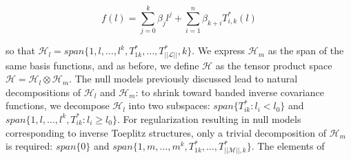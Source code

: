 \documentclass[12pt]{article}
\theoremstyle{definition}
\begin{document}
\begin{equation}
f\left(l\right) = \sum_{j=0}^k \beta_j l^j + \sum_{i=1}^n \beta_{k+i} T^*_{i,k}\left(l\right) \label{polynomial_expansion}
\end{equation} 

so that $\mathcal{H}_l = span\lbrace 1,l,\dots,l^k, T^*_{1k},\dots, T^*_{\vert \vert \mathcal{L} \vert \vert},k \rbrace$. We express $\mathcal{H}_m$ as the span of the same basis functions, and as before, we define $\mathcal{H}$ as the tensor product space $\mathcal{H} = \mathcal{H}_l \otimes \mathcal{H}_m$. The null models previously discussed lead to natural decompositions of $\mathcal{H}_l$ and $\mathcal{H}_m$: to shrink toward banded inverse covariance functions, we decompose $\mathcal{H}_l$ into two subspaces: $span\lbrace T^*_{ik}: l_i < l_0 \rbrace$ and $span\lbrace 1,l,\dots,l^k, T^*_{ik}: l_i \ge l_0 \rbrace$. For regularization resulting in null models corresponding to inverse Toeplitz structures, only a trivial decomposition of $\mathcal{H}_m$ is required: $span\lbrace 0 \rbrace$ and $span\lbrace 1,m,\dots,m^k,T^*_{1k},\dots,T^*_{\vert \vert \mathcal{M}\vert \vert,k} \rbrace$. The elements of 
% 
%
%
%
%
%
%
\end{document}
